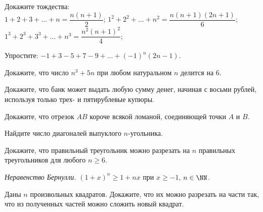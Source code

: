 
\begin{problems}

\item
Докажите тождества:
\\
\sbp $1 + 2 + 3 + \ldots + n = \dfrac{n (n + 1)}{2}$;
\qquad
\sbp $1^2 + 2^2 + \ldots + n^2 = \dfrac{n (n + 1) (2 n + 1)}{6}$;
\\[0.5ex]
\sbp $1^3 + 2^3 + 3^3 + \ldots + n^3 = \dfrac{n^2 (n + 1)^2}{4}$;

\item
Упростите: $-1 + 3 - 5 + 7 - 9 + \ldots + (-1)^n (2 n - 1)$.

\item
Докажите, что число $n^3 + 5 n$ при любом натуральном $n$ делится на 6.

\item
Докажите, что банк может выдать любую сумму денег, начиная с восьми рублей,
используя только трех- и пятирублевые купюры.

\item
Докажите, что отрезок $AB$ короче всякой ломаной, соединяющей точки $A$ и $B$.

\item
Найдите число диагоналей выпуклого $n$-угольника.

\item
Докажите, что правильный треугольник можно разрезать на $n$ правильных
треугольников для любого $n\geqslant 6$.

\item\emph{Неравенство Бернулли.}\;
\(
    (1 + x)^n \geq 1 + n x
\)\;
при $x \geq -1$, $n \in \NN$.

\item
Даны $n$ произвольных квадратов.
Докажите, что их можно разрезать на части так, что из полученных частей можно
сложить новый квадрат.

\end{problems}

